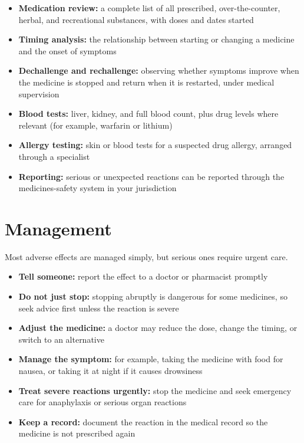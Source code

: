 \begin{itemize}
    \item \textbf{Medication review:} a complete list of all prescribed, over-the-counter, herbal, and recreational substances, with doses and dates started
    \item \textbf{Timing analysis:} the relationship between starting or changing a medicine and the onset of symptoms
    \item \textbf{Dechallenge and rechallenge:} observing whether symptoms improve when the medicine is stopped and return when it is restarted, under medical supervision
    \item \textbf{Blood tests:} liver, kidney, and full blood count, plus drug levels where relevant (for example, warfarin or lithium)
    \item \textbf{Allergy testing:} skin or blood tests for a suspected drug allergy, arranged through a specialist
    \item \textbf{Reporting:} serious or unexpected reactions can be reported through the medicines-safety system in your jurisdiction
\end{itemize}

\section*{Management}
Most adverse effects are managed simply, but serious ones require urgent care.

\begin{itemize}
    \item \textbf{Tell someone:} report the effect to a doctor or pharmacist promptly
    \item \textbf{Do not just stop:} stopping abruptly is dangerous for some medicines, so seek advice first unless the reaction is severe
    \item \textbf{Adjust the medicine:} a doctor may reduce the dose, change the timing, or switch to an alternative
    \item \textbf{Manage the symptom:} for example, taking the medicine with food for nausea, or taking it at night if it causes drowsiness
    \item \textbf{Treat severe reactions urgently:} stop the medicine and seek emergency care for anaphylaxis or serious organ reactions
    \item \textbf{Keep a record:} document the reaction in the medical record so the medicine is not prescribed again
\end{itemize}

